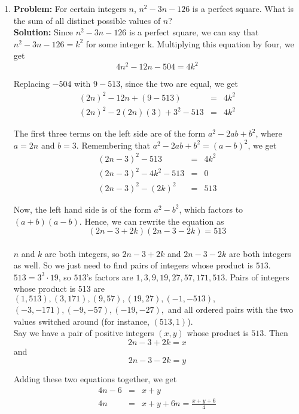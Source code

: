 \documentclass{article}
\begin{document}
\begin{enumerate}
\item \textbf{Problem:} For certain integers $n$, $n^2 - 3n - 126$ is a perfect square.   What is the sum of all distinct possible values of $n$? \\

\textbf{Solution:} Since $n^2 - 3n - 126$ is a perfect square, we can say that $n^2 - 3n - 126 = k^2$ for some integer k.  Multiplying this equation by four, we get
\[4n^2 - 12n - 504 = 4k^2\]

Replacing $-504$ with $9-513$, since the two are equal, we get
\begin{eqnarray*}
(2n)^2 - 12n + (9-513) &=& 4k^2 \\
(2n)^2 - 2(2n)(3) + 3^2 - 513 &=& 4k^2
\end{eqnarray*}

The first three terms on the left side are of the form $a^2 - 2ab + b^2$, where $a = 2n$ and $b = 3$.  Remembering that $a^2 - 2ab + b^2 = (a-b)^2$, we get
\begin{eqnarray*}
(2n - 3)^2 - 513 &=& 4k^2 \\
(2n - 3)^2 - 4k^2 - 513 &=& 0 \\
(2n - 3)^2 - (2k)^2 &=& 513
\end{eqnarray*}

Now, the left hand side is of the form $a^2 - b^2$, which factors to $(a+b)(a-b)$.  Hence, we can rewrite the equation as
\[(2n - 3 + 2k)(2n - 3 - 2k) = 513\] \\
$n$ and $k$ are both integers, so $2n - 3 + 2k$ and $2n - 3 - 2k$ are both integers as well.  So we just need to find pairs of integers whose product is $513$. \\

$513 = 3^3 \cdot 19$, so $513$'s factors are {$1,3,9,19,27,57,171,513$}.  Pairs of integers whose product is 513 are $(1,513), (3,171), (9,57), (19,27), (-1,-513),$ $(-3,-171), (-9,-57), (-19,-27),$ and all ordered pairs with the two values switched around (for instance, $(513,1)$). \\

Say we have a pair of positive integers $(x,y)$ whose product is $513$.  Then
\[2n - 3 + 2k = x\] and \[2n - 3 - 2k = y\]

Adding these two equations together, we get
\begin{eqnarray*}
4n - 6 &=& x + y \\
4n &=& x + y + 6
\displaystyle n = \frac{x+y+6}{4} \\
\end{eqnarray*}


\end{enumerate}
\end{document}
